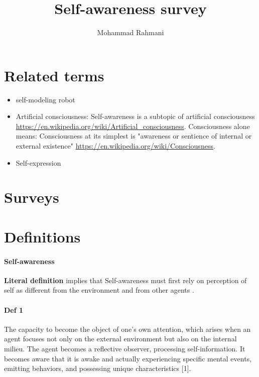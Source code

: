 \documentclass{article}
\begin{document}
	
	\title{Self-awareness survey}
	\author{Mohammad Rahmani}
	\date{}
	\maketitle
	\section{Related terms}
		\begin{itemize}
			\item self-modeling robot \citep{kwiatkowski-2019-task-agnostic-self-modeling-machines}
			\item Artificial consciousness: Self-awareness is a subtopic of artificial consciousness \url{https://en.wikipedia.org/wiki/Artificial_consciousness}. Consciousness alone means: Consciousness at its simplest is "awareness or sentience of internal or external existence" \url{https://en.wikipedia.org/wiki/Consciousness}.
			\item Self-expression \citep{lewis-2011-a-survey-of-self-awareness-and-its-application-in-computing-systems}
		\end{itemize}
	\section{Surveys}
	
	\section{Definitions}
		\paragraph{Self-awareness}
		\textbf{Literal definition} implies that Self-awareness must first rely on perception of self as different from the environment and from other agents \cite{chatila-2018-toward-self-aware-robots}.
		
		\paragraph{Def 1} The capacity to become the object of one’s own attention, which arises when an agent focuses not only on the external environment but also on the internal milieu. The agent becomes a reflective observer, processing self-information. It becomes aware that
		it is awake and actually experiencing specific mental events, emitting behaviors, and possessing unique characteristics \citet{regazzoni-2020-multi-sensorial-generative-and-descriptive-self-awareness-models-for-autonomous-systems}[1].
		\\
\end{document}
